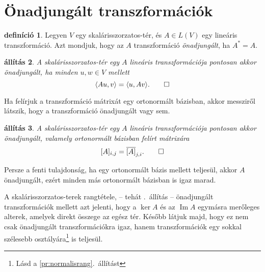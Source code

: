 \documentclass[9pt, a4paper, showtrims]{memoir}
\theoremstyle{plain}
\newtheorem{proposition}{állítás}[chapter]
\theoremstyle{remark}
\theoremstyle{definition}
\newtheorem{definition}[proposition]{definíció}
\DeclareMathOperator{\im}{Im}
\newcommand{\ip}[2]{\langle#1,#2\rangle}
\begin{document}
\section{Önadjungált transzformációk}
\begin{definition}
	Legyen $V$ egy skalárisszorzatos-tér, és $A\in L\left( V \right)$ egy lineáris transzformáció.
	Azt mondjuk, hogy az $A$ transzformáció
	\emph{önadjungált},
	ha $A^\ast=A$.
\end{definition}

\begin{proposition}
	A skalárisszorzatos-tér egy $A$ lineáris transzformációja pontosan akkor önadjungált,
	ha minden $u,w\in V$ mellett
	\[
		\ip{Au}{v}
		=
		\ip{u}{Av}.
		\qedhere
	\]
\end{proposition}
Ha felírjuk a transzformáció mátrixát egy ortonormált bázisban, akkor messziről látszik,
hogy a transzformáció önadjungált vagy sem.
\begin{proposition}
	A skalárisszorzatos-tér egy $A$ lineáris transzformációja pontosan akkor önadjungált,
	valamely ortonormált bázisban felírt mátrixára
	\[
		[A]_{i,j}=\overline{[A]}_{j,i}.
		\qedhere
	\]
\end{proposition}
Persze a fenti tulajdonság, ha egy ortonormált bázis mellett teljesül,
akkor $A$ önadjungált, ezért minden más ortonormált bázisban is igaz marad.

A skalárisszorzatos-terek rangtétele, -- tehát .~állítás -- önadjungált transzformációk mellett azt jelenti,
hogy
a $\ker A$ és az $\im A$ egymásra merőleges alterek,
amelyek direkt összege az egész tér.
Később látjuk majd, hogy ez nem csak önadjungált transzformációkra igaz,
hanem transzformációk egy sokkal szélesebb osztályára\footnote{Lásd a \ref{pr:normalisrang}.~állítást} is teljesül.
\end{document}
